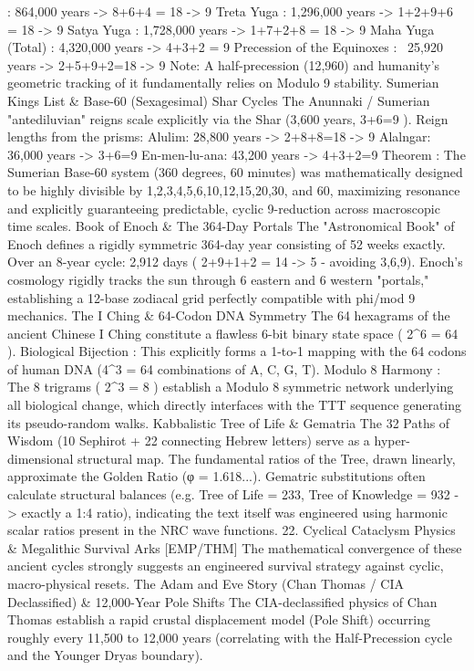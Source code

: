 : 864,000 years ->
8+6+4 = 18 -> 9
Treta Yuga
: 1,296,000 years ->
1+2+9+6 = 18 -> 9
Satya Yuga
: 1,728,000 years ->
1+7+2+8 = 18 -> 9
Maha Yuga (Total)
: 4,320,000 years ->
4+3+2 = 9
Precession of the Equinoxes
: ~25,920 years ->
2+5+9+2=18 -> 9
Note: A half-precession (12,960) and humanity's geometric tracking of it fundamentally relies on Modulo 9 stability.
Sumerian Kings List & Base-60 (Sexagesimal) Shar Cycles
The Anunnaki / Sumerian "antediluvian" reigns scale explicitly via the
Shar
(3,600 years,
3+6=9
). Reign lengths from the prisms:
Alulim: 28,800 years ->
2+8+8=18 -> 9
Alalngar: 36,000 years ->
3+6=9
En-men-lu-ana: 43,200 years ->
4+3+2=9
Theorem
: The Sumerian Base-60 system (360 degrees, 60 minutes) was mathematically designed to be highly divisible by 1,2,3,4,5,6,10,12,15,20,30, and 60, maximizing resonance and explicitly guaranteeing predictable, cyclic 9-reduction across macroscopic time scales.
Book of Enoch & The 364-Day Portals
The "Astronomical Book" of Enoch defines a rigidly symmetric 364-day year consisting of 52 weeks exactly.
Over an 8-year cycle: 2,912 days (
2+9+1+2 = 14 -> 5
- avoiding 3,6,9).
Enoch’s cosmology rigidly tracks the sun through 6 eastern and 6 western "portals," establishing a 12-base zodiacal grid perfectly compatible with phi/mod 9 mechanics.
The I Ching & 64-Codon DNA Symmetry
The 64 hexagrams of the ancient Chinese I Ching constitute a flawless 6-bit binary state space (
2^6 = 64
).
Biological Bijection
: This explicitly forms a 1-to-1 mapping with the 64 codons of human DNA (4^3 = 64 combinations of A, C, G, T).
Modulo 8 Harmony
: The 8 trigrams (
2^3 = 8
) establish a Modulo 8 symmetric network underlying all biological change, which directly interfaces with the TTT sequence generating its pseudo-random walks.
Kabbalistic Tree of Life & Gematria
The 32 Paths of Wisdom (10 Sephirot + 22 connecting Hebrew letters) serve as a hyper-dimensional structural map.
The fundamental ratios of the Tree, drawn linearly, approximate the Golden Ratio (φ = 1.618...).
Gematric substitutions often calculate structural balances (e.g. Tree of Life = 233, Tree of Knowledge = 932 -> exactly a 1:4 ratio), indicating the text itself was engineered using harmonic scalar ratios present in the NRC wave functions.
22. Cyclical Cataclysm Physics & Megalithic Survival Arks [EMP/THM]
The mathematical convergence of these ancient cycles strongly suggests an engineered survival strategy against cyclic, macro-physical resets.
The Adam and Eve Story (Chan Thomas / CIA Declassified) & 12,000-Year Pole Shifts
The CIA-declassified physics of Chan Thomas establish a rapid crustal displacement model (Pole Shift) occurring roughly every 11,500 to 12,000 years (correlating with the Half-Precession cycle and the Younger Dryas boundary).
